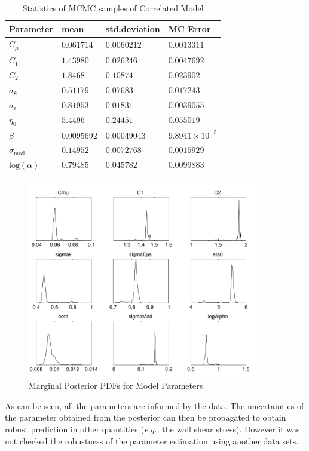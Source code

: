 \documentclass[11pt,titlepage]{article}
\begin{document}
\begin{table}[htbp]
	\centering
	    \caption{Statistics of MCMC samples of Correlated Model}
		\begin{tabular}{l l l l}
			\hline \hline
			Parameter										& mean 				& std.deviation			& MC Error 		\\
			\hline
			$C_\mu$											& $0.061714$	& $0.0060212$ 			& $0.0013311$ \\
			$C_1$												& $1.43980$	 	& $0.026246$ 				& $0.0047692 $ \\
			$C_2$												& $1.8468$ 		&	$0.10874$ 				& $0.023902$ \\
			$\sigma_k$									& $0.51179$ 	& $0.07683$ 				& $0.017243$ \\
			$\sigma_\epsilon$						& $0.81953$ 	& $0.01831$ 				& $0.0039055$ \\
			$\eta_0$										& $5.4496$ 		& $0.24451$ 				& $0.055019$ \\
			$\beta$							   			& $0.0095692$ & $0.00049043$ 			& $9.8941 \times 10^{-5}$ \\
			$\sigma_{\text{mod}}$				& $0.14952$ 	& $0.0072768$ 			& $0.0015929$ \\
			$\text{log}(\alpha)$				& $0.79485$ 	& $0.045782$ 				& $0.0099883$ \\       
			\hline
		\end{tabular}
	\label{tab:StatMCMCCorr}
\end{table}

\begin{figure}[htbp]
	\centering
	\includegraphics[width=0.9\textwidth]{ParamEstCorrDRAM.pdf}
	\caption{Marginal Posterior PDFs for Model Parameters}
	\label{fig:MarginalPosteriorPDFsForModelParameters}
\end{figure}
As can be seen, all the parameters are informed by the data. The uncertainties of the parameter obtained from the posterior can then be propagated to obtain robust prediction in other quantities (\textit{e.g.,} the wall shear stress). However it was not checked the robustness of the parameter estimation using another data sets. 
\end{document}
